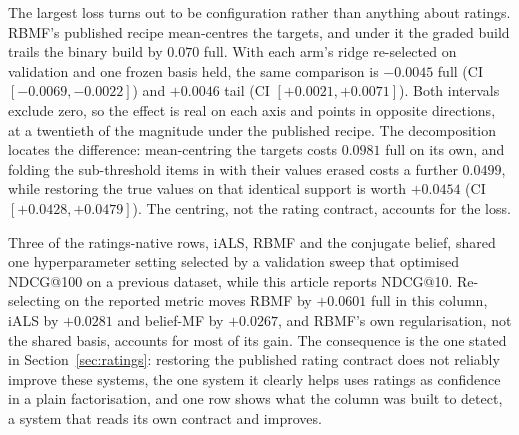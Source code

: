 \documentclass[manuscript,screen,review]{acmart}
\begin{document}
The largest loss turns out to be configuration rather than anything about ratings. RBMF's published recipe mean-centres the targets, and under it the graded build trails the binary build by $0.070$ full. With each arm's ridge re-selected on validation and one frozen basis held, the same comparison is $-0.0045$ full (CI $[-0.0069,-0.0022]$) and $+0.0046$ tail (CI $[+0.0021,+0.0071]$). Both intervals exclude zero, so the effect is real on each axis and points in opposite directions, at a twentieth of the magnitude under the published recipe. The decomposition locates the difference: mean-centring the targets costs $0.0981$ full on its own, and folding the sub-threshold items in with their values erased costs a further $0.0499$, while restoring the true values on that identical support is worth $+0.0454$ (CI $[+0.0428,+0.0479]$). The centring, not the rating contract, accounts for the loss.

Three of the ratings-native rows, iALS, RBMF and the conjugate belief, shared one hyperparameter setting selected by a validation sweep that optimised NDCG@100 on a previous dataset, while this article reports NDCG@10. Re-selecting on the reported metric moves RBMF by $+0.0601$ full in this column, iALS by $+0.0281$ and belief-MF by $+0.0267$, and RBMF's own regularisation, not the shared basis, accounts for most of its gain. The consequence is the one stated in Section~\ref{sec:ratings}: restoring the published rating contract does not reliably improve these systems, the one system it clearly helps uses ratings as confidence in a plain factorisation, and one row shows what the column was built to detect, a system that reads its own contract and improves.
\end{document}
